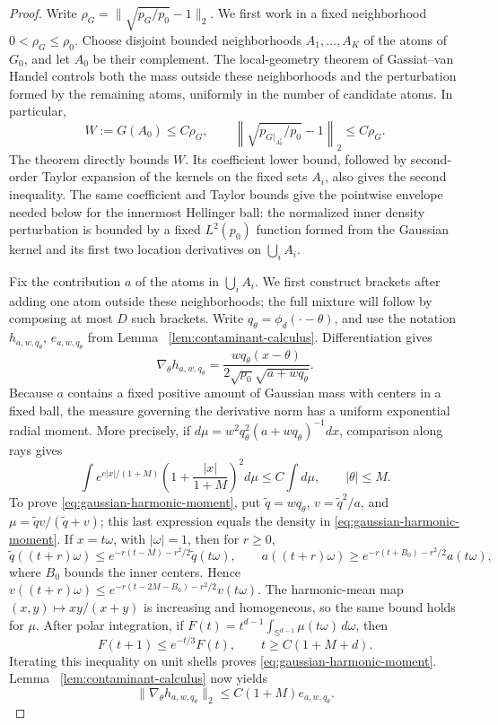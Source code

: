 \documentclass[11pt]{article}
\theoremstyle{definition}
\numberwithin{equation}{section}
\begin{document}
\begin{proof}
Write \(\rho_G=\|\sqrt{p_G/p_0}-1\|_2\). We first work in a fixed
neighborhood \(0<\rho_G\le\rho_0\). Choose disjoint bounded neighborhoods
\(A_1,\ldots,A_K\) of the atoms of \(G_0\), and let \(A_0\) be their
complement. The local-geometry theorem of Gassiat--van Handel
\cite[Theorem~3.10]{gassiatVanHandel2014} controls both the mass outside
these neighborhoods and the perturbation formed by the remaining atoms,
uniformly in the number of candidate atoms. In particular,
\begin{equation}
\label{eq:gaussian-local-geometry}
 W:=G(A_0)\le C\rho_G,
 \qquad
 \left\|\sqrt{p_{G|_{A_0^c}}/p_0}-1\right\|_2\le C\rho_G.
\end{equation}
The theorem directly bounds \(W\). Its coefficient lower bound, followed by
second-order Taylor expansion of the kernels on the fixed sets \(A_i\), also
gives the second inequality. The same coefficient and Taylor bounds give the
pointwise envelope needed below for the innermost Hellinger ball: the
normalized inner density perturbation is bounded by a fixed \(L^2(p_0)\)
function formed from the Gaussian kernel and its first two location
derivatives on \(\bigcup_iA_i\).

Fix the contribution \(a\) of the atoms in \(\bigcup_iA_i\). We first
construct brackets after adding one atom outside these neighborhoods; the
full mixture will follow by composing at most \(D\) such brackets.
Write \(q_\theta=\phi_d(\cdot-\theta)\), and use the notation
\(h_{a,w,q_\theta}\), \(e_{a,w,q_\theta}\) from Lemma
~\ref{lem:contaminant-calculus}. Differentiation gives
\[
 \nabla_\theta h_{a,w,q_\theta}
 =\frac{wq_\theta(x-\theta)}
 {2\sqrt{p_0}\sqrt{a+wq_\theta}}.
\]
Because \(a\) contains a fixed positive amount of Gaussian mass with
centers in a fixed ball, the measure governing the derivative norm has a
uniform exponential radial moment. More precisely, if
\(d\mu=w^2q_\theta^2(a+wq_\theta)^{-1}dx\), comparison along rays gives
\begin{equation}
\label{eq:gaussian-harmonic-moment}
 \int e^{c|x|/(1+M)}
 \left(1+\frac{|x|}{1+M}\right)^2d\mu
 \le C\int d\mu,
 \qquad |\theta|\le M.
\end{equation}
To prove \eqref{eq:gaussian-harmonic-moment}, put
\(\widetilde q=wq_\theta\),
\(v=\widetilde q^2/a\), and
\(\mu=\widetilde qv/(\widetilde q+v)\); this last expression equals the
density in \eqref{eq:gaussian-harmonic-moment}. If \(x=t\omega\), with
\(|\omega|=1\), then for \(r\ge0\),
\[
 \widetilde q((t+r)\omega)
 \le e^{-r(t-M)-r^2/2}\widetilde q(t\omega),
 \qquad
 a((t+r)\omega)
 \ge e^{-r(t+B_0)-r^2/2}a(t\omega),
\]
where \(B_0\) bounds the inner centers. Hence
\(v((t+r)\omega)\le
e^{-r(t-2M-B_0)-r^2/2}v(t\omega)\). The harmonic-mean map
\((x,y)\mapsto xy/(x+y)\) is increasing and homogeneous, so the same
bound holds for \(\mu\). After polar integration, if
\(F(t)=t^{d-1}\int_{\mathbb S^{d-1}}\mu(t\omega)\,d\omega\), then
\[
 F(t+1)\le e^{-t/3}F(t),
 \qquad t\ge C(1+M+d).
\]
Iterating this inequality on unit shells proves
\eqref{eq:gaussian-harmonic-moment}. Lemma
~\ref{lem:contaminant-calculus} now yields
\[
 \|\nabla_\theta h_{a,w,q_\theta}\|_2
 \le C(1+M)e_{a,w,q_\theta}.
\]


\end{proof}
\end{document}
